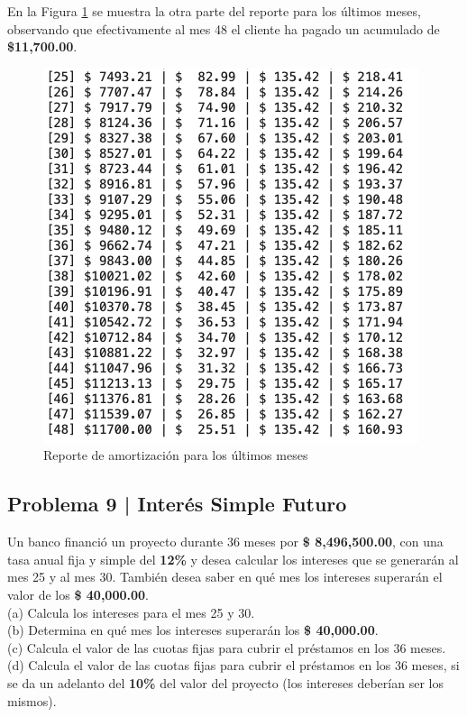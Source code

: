 \documentclass{article}
\begin{document}
\break
\noindent
En la Figura \ref{fig:s108-3} se muestra la otra parte del reporte para los últimos meses, observando que efectivamente al mes 48 el cliente ha pagado un acumulado de \textbf{\$11,700.00}.
\begin{figure}[!ht]
    \centering
    \begin{minipage}{\textwidth}
        \centering
        \includegraphics[width=\textwidth]{figures/s108-3.png}
    \end{minipage}
    \captionsetup{width=0.9\textwidth}
    \caption{Reporte de amortización para los últimos meses}
    \label{fig:s108-3}
\end{figure}

\clearpage

\subsection*{Problema 9 | Interés Simple Futuro}

Un banco financió un proyecto durante 36 meses por \textbf{\$ 8,496,500.00}, con una tasa anual fija y simple del \textbf{12\%} y desea calcular los intereses que se generarán al mes 25 y al mes 30. También desea saber en qué mes los intereses superarán el valor de los \textbf{\$ 40,000.00}.
\\[12pt]
(a) Calcula los intereses para el mes 25 y 30.
\\[6pt]
(b) Determina en qué mes los intereses superarán los \textbf{\$ 40,000.00}.
\\[6pt]
(c) Calcula el valor de las cuotas fijas para cubrir el préstamos en los 36 meses.
\\[6pt]
(d) Calcula el valor de las cuotas fijas para cubrir el préstamos en los 36 meses, si se da un adelanto del \textbf{10\%} del valor del proyecto (los intereses deberían ser los mismos).
\end{document}
